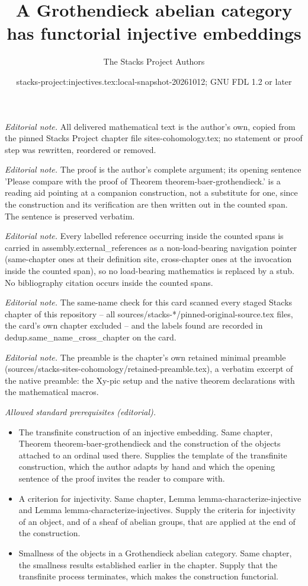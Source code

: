 \documentclass[10pt,a4paper]{amsart}
\title{A Grothendieck abelian category has functorial injective embeddings}
\author{The Stacks Project Authors}
\date{stacks-project:injectives.tex:local-snapshot-20261012; GNU FDL 1.2 or later}
\theoremstyle{plain}
\theoremstyle{definition}
\theoremstyle{remark}
\numberwithin{equation}{subsection}
\begin{document}
\maketitle
\noindent\textit{Editorial note.} All delivered mathematical text is the author's own, copied from the pinned Stacks Project chapter file sites-cohomology.tex; no statement or proof step was rewritten, reordered or removed.\par\medskip
\noindent\textit{Editorial note.} The proof is the author's complete argument; its opening sentence 'Please compare with the proof of Theorem theorem-baer-grothendieck.' is a reading aid pointing at a companion construction, not a substitute for one, since the construction and its verification are then written out in the counted span. The sentence is preserved verbatim.\par\medskip
\noindent\textit{Editorial note.} Every labelled reference occurring inside the counted spans is carried in assembly.external\_references as a non-load-bearing navigation pointer (same-chapter ones at their definition site, cross-chapter ones at the invocation inside the counted span), so no load-bearing mathematics is replaced by a stub. No bibliography citation occurs inside the counted spans.\par\medskip
\noindent\textit{Editorial note.} The same-name check for this card scanned every staged Stacks chapter of this repository -- all sources/stacks-*/pinned-original-source.tex files, the card's own chapter excluded -- and the labels found are recorded in dedup.same\_name\_cross\_chapter on the card.\par\medskip
\noindent\textit{Editorial note.} The preamble is the chapter's own retained minimal preamble (sources/stacks-sites-cohomology/retained-preamble.tex), a verbatim excerpt of the native preamble: the Xy-pic setup and the native theorem declarations with the mathematical macros.\par\medskip
\noindent\textit{Allowed standard prerequisites (editorial).}\begin{itemize}
\item The transfinite construction of an injective embedding. Same chapter, Theorem theorem-baer-grothendieck and the construction of the objects attached to an ordinal used there. Supplies the template of the transfinite construction, which the author adapts by hand and which the opening sentence of the proof invites the reader to compare with.
\item A criterion for injectivity. Same chapter, Lemma lemma-characterize-injective and Lemma lemma-characterize-injectives. Supply the criteria for injectivity of an object, and of a sheaf of abelian groups, that are applied at the end of the construction.
\item Smallness of the objects in a Grothendieck abelian category. Same chapter, the smallness results established earlier in the chapter. Supply that the transfinite process terminates, which makes the construction functorial.
\end{itemize}\medskip
\end{document}
